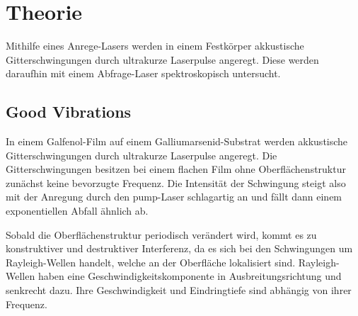 \section{Theorie}

Mithilfe eines Anrege-Lasers werden in einem Festkörper akkustische Gitterschwingungen durch ultrakurze Laserpulse angeregt. Diese werden daraufhin mit einem Abfrage-Laser spektroskopisch untersucht.

\subsection{Good Vibrations}

In einem Galfenol-Film auf einem Galliumarsenid-Substrat werden akkustische Gitterschwingungen durch ultrakurze Laserpulse angeregt. Die Gitterschwingungen besitzen bei einem flachen Film ohne Oberflächenstruktur zunächst keine bevorzugte Frequenz. Die Intensität der Schwingung steigt also mit der Anregung durch den pump-Laser schlagartig an und fällt dann einem exponentiellen Abfall ähnlich ab.\par

Sobald die Oberflächenstruktur periodisch verändert wird, kommt es zu konstruktiver und destruktiver Interferenz, da es sich bei den Schwingungen um Rayleigh-Wellen handelt, welche an der Oberfläche lokalisiert sind. Rayleigh-Wellen haben eine Geschwindigkeitskomponente in Ausbreitungsrichtung und senkrecht dazu. Ihre Geschwindigkeit und Eindringtiefe sind abhängig von ihrer Frequenz.
